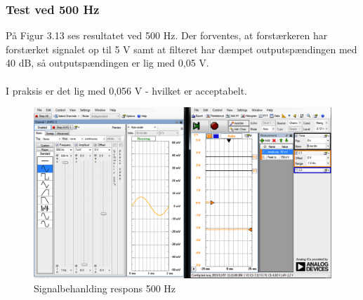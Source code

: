 \subsubsection{Test ved 500 Hz}
På Figur 3.13 ses resultatet ved 500 Hz. Der forventes, at forstærkeren har forstærket signalet op til 5 V samt at filteret har dæmpet outputspændingen med 40 dB, så outputspændingen er lig med 0,05 V.    
\\ \\
I praksis er det lig med 0,056 V - hvilket er acceptabelt. 

\begin{figure}[H]
	\centering
	\includegraphics[width=1\textwidth]{Figurer/Snip20151207_45}
	\caption{Signalbehanlding respons 500 Hz}
	\label{fig:Signalbehanlding}
\end{figure}




